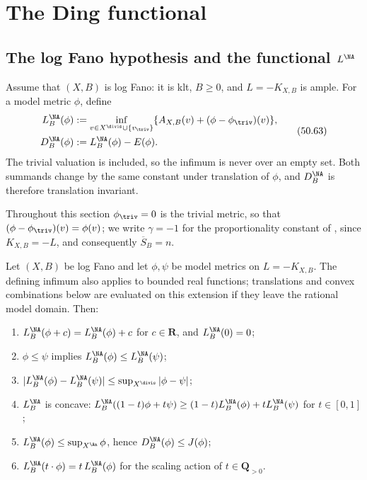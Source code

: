\section{The Ding functional}
\label{sec:ch50-ding}

\subsection{The log Fano hypothesis and the functional \texorpdfstring{$L^{\NA}$}{L NA}}
\label{sec:ch50-L}

Assume that $(X,B)$ is log Fano: it is klt, $B\geq0$, and
$L=-K_{X,B}$ is ample.  For a model metric $\phi$, define
\[
 \begin{split}
 L_B^{\NA}(\phi)
   &:=\inf_{v\in X^{\divis}\cup\{v_{\triv}\}}
        \{A_{X,B}(v)+(\phi-\phi_{\triv})(v)\},\\
 D_B^{\NA}(\phi)&:=L_B^{\NA}(\phi)-E(\phi).
 \end{split}
\tag{50.63}\label{eq:stability-Ding}
\]
The trivial valuation is included, so the infimum is never over an empty
set.  Both summands change by the same constant under translation of
$\phi$, and $D_B^{\NA}$ is therefore translation invariant.

Throughout this section $\phi_{\triv}=0$ is the trivial metric, so that
$(\phi-\phi_{\triv})(v)=\phi(v)$; we write $\gamma=-1$ for the
proportionality constant of , since
$K_{X,B}=-L$, and consequently $\overline S_B=n$.

\begin{proposition}
\label{prop:ch50-L-elementary}
Let $(X,B)$ be log Fano and let $\phi,\psi$ be model metrics on
$L=-K_{X,B}$.  The defining infimum also applies to bounded real
functions; translations and convex combinations below are evaluated on
this extension if they leave the rational model domain.  Then:
\begin{enumerate}
\item\label{itm:ch50-L:transl}
      $L^{\NA}_B(\phi+c)=L^{\NA}_B(\phi)+c$ for $c\in\mathbf R$, and
      $L^{\NA}_B(0)=0$;
\item\label{itm:ch50-L:mono}
      $\phi\le\psi$ implies $L^{\NA}_B(\phi)\le L^{\NA}_B(\psi)$;
\item\label{itm:ch50-L:lip}
      $|L^{\NA}_B(\phi)-L^{\NA}_B(\psi)|\le\sup_{X^{\divis}}|\phi-\psi|$;
\item\label{itm:ch50-L:concave}
      $L^{\NA}_B$ is concave: $L^{\NA}_B((1-t)\phi+t\psi)\ge
      (1-t)L^{\NA}_B(\phi)+tL^{\NA}_B(\psi)$ for $t\in[0,1]$;
\item\label{itm:ch50-L:bounds}
      $L^{\NA}_B(\phi)\le\sup_{X^{\An}}\phi$, hence
      $D^{\NA}_B(\phi)\le J(\phi)$;
\item\label{itm:ch50-L:scaling}
      $L^{\NA}_B(t\cdot\phi)=t\,L^{\NA}_B(\phi)$ for the scaling action
      of $t\in\mathbf Q_{>0}$.
\end{enumerate}
\end{proposition}

